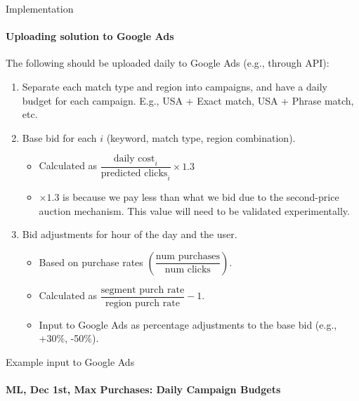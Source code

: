 \documentclass[smaller]{beamer}
\begin{document}
\begin{frame}{Implementation}
\framesubtitle{Uploading solution to Google Ads}

The following should be uploaded daily to Google Ads (e.g., through API):

\begin{enumerate}
    \item Separate each match type and region into campaigns, and have a daily budget for each campaign. E.g., USA + Exact match, USA + Phrase match, etc.
    \item Base bid for each $i$ (keyword, match type, region combination).
        \begin{itemize}
            \item Calculated as $\dfrac{\text{daily cost}_i}{\text{predicted clicks}_i} \times 1.3$
            \item $\times 1.3$ is because we pay less than what we bid due to the second-price auction mechanism. This value will need to be validated experimentally.
        \end{itemize}
    \item Bid adjustments for hour of the day and the user.
        \begin{itemize}
            \item Based on purchase rates $\left(\dfrac{\text{num purchases}}{\text{num clicks}}\right)$.
            \item Calculated as $\dfrac{\text{segment purch rate}}{\text{region purch rate}} - 1$.
            \item Input to Google Ads as percentage adjustments to the base bid (e.g., +30\%, -50\%).
        \end{itemize}
\end{enumerate}
\end{frame}

\begin{frame}{Example input to Google Ads}
\framesubtitle{ML, Dec 1st, Max Purchases: Daily Campaign Budgets}
\begin{table}[h!]
\centering
{}
\caption{Daily budget by region and match type.}
\end{table}
\end{frame}
\end{document}
